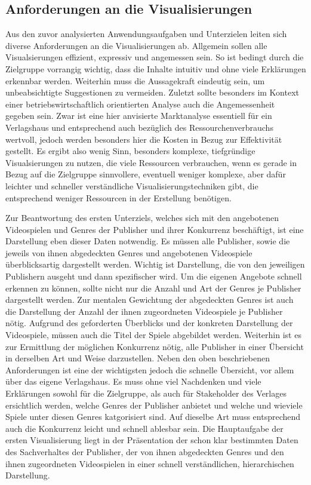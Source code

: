 \documentclass[usegeometry=true]{scrartcl}
\begin{document}
\subsection{Anforderungen an die Visualisierungen}
Aus den zuvor analysierten Anwendungsaufgaben und Unterzielen leiten sich diverse Anforderungen an die Visualisierungen ab. 
Allgemein sollen alle Visualsierungen effizient, expressiv und angemessen sein. So ist bedingt durch die Zielgruppe vorrangig wichtig, dass die Inhalte intuitiv und ohne viele Erklärungen erkennbar werden. 
Weiterhin muss die Aussagekraft eindeutig sein, um unbeabsichtigte Suggestionen zu vermeiden. Zuletzt sollte besonders im Kontext einer betriebswirtschaftlich orientierten Analyse auch die Angemessenheit gegeben sein. 
Zwar ist eine hier anvisierte Marktanalyse essentiell für ein Verlagshaus und entsprechend auch bezüglich des Ressourchenverbrauchs wertvoll, jedoch werden besonders hier die Kosten in Bezug zur Effektivität gestellt. 
Es ergibt also wenig Sinn, besonders komplexe, tiefgründige Visualsierungen zu nutzen, die viele Ressourcen verbrauchen, wenn es gerade in Bezug auf die Zielgruppe sinnvollere, eventuell weniger komplexe, 
aber dafür leichter und schneller verständliche Visualisierungstechniken gibt, die entsprechend weniger Ressourcen in der Erstellung benötigen. 

Zur Beantwortung des ersten Unterziels, welches sich mit den angebotenen Videospielen und Genres der Publisher und ihrer Konkurrenz beschäftigt, ist eine Darstellung eben dieser Daten notwendig. 
Es müssen alle Publisher, sowie die jeweils von ihnen abgedeckten Genres und angebotenen Videospiele überblicksartig dargestellt werden. 
Wichtig ist Darstellung, die von den jeweiligen Publishern ausgeht und dann spezifischer wird. 
Um die eigenen Angebote schnell erkennen zu können, sollte nicht nur die Anzahl und Art der Genres je Publisher dargestellt werden. 
Zur mentalen Gewichtung der abgedeckten Genres ist auch die Darstellung der Anzahl der ihnen zugeordneten Videospiele je Publisher nötig. 
Aufgrund des geforderten Überblicks und der konkreten Darstellung der Videospiele, müssen auch die Titel der Spiele abgebildet werden. 
Weiterhin ist es zur Ermittlung der möglichen Konkurrenz nötig, alle Publisher in einer Übersicht in derselben Art und Weise darzustellen. 
Neben den oben beschriebenen Anforderungen ist eine der wichtigsten jedoch die schnelle Übersicht, vor allem über das eigene Verlagshaus. 
Es muss ohne viel Nachdenken und viele Erklärungen sowohl für die Zielgruppe, als auch für Stakeholder des Verlages ersichtlich werden, welche Genres der Publisher anbietet und welche und wieviele Spiele unter diesen Genres katgorisiert sind.
Auf dieselbe Art muss entsprechend auch die Konkurrenz leicht und schnell ablesbar sein. 
Die Hauptaufgabe der ersten Visualisierung liegt in der Präsentation der schon klar bestimmten Daten des Sachverhaltes der Publisher, der von ihnen abgedeckten Genres und den ihnen zugeordneten Videospielen in einer schnell verständlichen, hierarchischen Darstellung.
\end{document}
